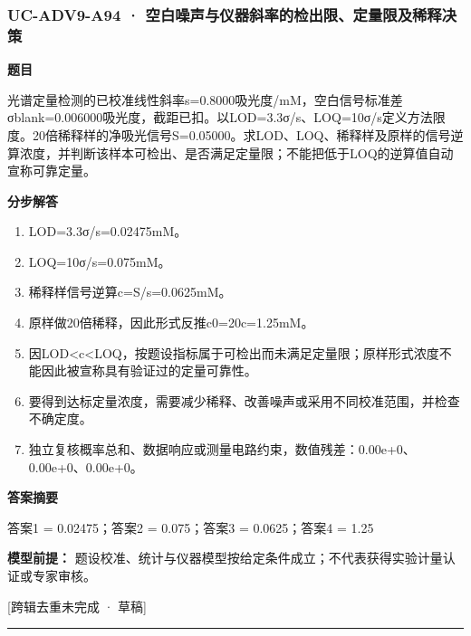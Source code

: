 \documentclass[UTF8,11pt,a4paper]{ctexart}
\begin{document}
\subsubsection*{UC-ADV9-A94 · 空白噪声与仪器斜率的检出限、定量限及稀释决策}
\noindent\textbf{题目}\par
光谱定量检测的已校准线性斜率s=0.8000吸光度/mM，空白信号标准差σblank=0.006000吸光度，截距已扣。以LOD=3.3σ/s、LOQ=10σ/s定义方法限度。20倍稀释样的净吸光信号S=0.05000。求LOD、LOQ、稀释样及原样的信号逆算浓度，并判断该样本可检出、是否满足定量限；不能把低于LOQ的逆算值自动宣称可靠定量。\par
\medskip\noindent\textbf{分步解答}
\begin{enumerate}
\item LOD=3.3σ/s=0.02475mM。
\item LOQ=10σ/s=0.075mM。
\item 稀释样信号逆算c=S/s=0.0625mM。
\item 原样做20倍稀释，因此形式反推c0=20c=1.25mM。
\item 因LOD<c<LOQ，按题设指标属于可检出而未满足定量限；原样形式浓度不能因此被宣称具有验证过的定量可靠性。
\item 要得到达标定量浓度，需要减少稀释、改善噪声或采用不同校准范围，并检查不确定度。
\item 独立复核概率总和、数据响应或测量电路约束，数值残差：0.00e+0、0.00e+0、0.00e+0。
\end{enumerate}
\noindent\textbf{答案摘要}\par
答案1 = 0.02475；答案2 = 0.075；答案3 = 0.0625；答案4 = 1.25\par
\noindent\textbf{模型前提：}
题设校准、统计与仪器模型按给定条件成立；不代表获得实验计量认证或专家审核。\par
\noindent\textcolor{red!65!black}{[跨辑去重未完成 · 草稿]} \par
\medskip\hrule\medskip
{}
\end{document}
